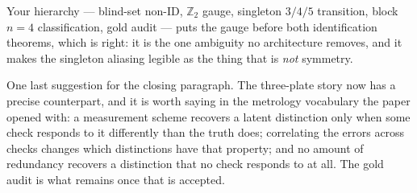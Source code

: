\documentclass[11pt]{article}
\theoremstyle{remark}
\newcommand{\Z}{\mathbb{Z}_2}
\begin{document}
Your hierarchy --- blind-set non-ID, $\Z$ gauge, singleton $3/4/5$ transition, block $n=4$ classification, gold audit --- puts the gauge before both identification theorems, which is right: it is the one ambiguity no architecture removes, and it makes the singleton aliasing legible as the thing that is \emph{not} symmetry.

One last suggestion for the closing paragraph. The three-plate story now has a precise counterpart, and it is worth saying in the metrology vocabulary the paper opened with: a measurement scheme recovers a latent distinction only when some check responds to it differently than the truth does; correlating the errors across checks changes which distinctions have that property; and no amount of redundancy recovers a distinction that no check responds to at all. The gold audit is what remains once that is accepted.
\end{document}
